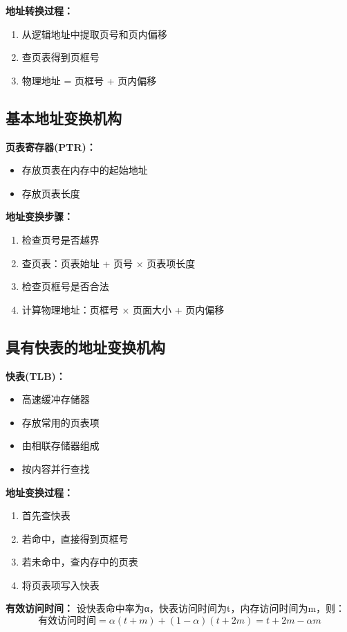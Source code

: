 \documentclass[lang=cn,newtx,10pt,scheme=chinese]{../../elegantbook}
\begin{document}
\textbf{地址转换过程：}
\begin{enumerate}
  \item 从逻辑地址中提取页号和页内偏移
  \item 查页表得到页框号
  \item 物理地址 = 页框号 + 页内偏移
\end{enumerate}

\subsection{基本地址变换机构}

\textbf{页表寄存器(PTR)：}
\begin{itemize}
  \item 存放页表在内存中的起始地址
  \item 存放页表长度
\end{itemize}

\textbf{地址变换步骤：}
\begin{enumerate}
  \item 检查页号是否越界
  \item 查页表：页表始址 + 页号 × 页表项长度
  \item 检查页框号是否合法
  \item 计算物理地址：页框号 × 页面大小 + 页内偏移
\end{enumerate}

\subsection{具有快表的地址变换机构}

\textbf{快表(TLB)：}
\begin{itemize}
  \item 高速缓冲存储器
  \item 存放常用的页表项
  \item 由相联存储器组成
  \item 按内容并行查找
\end{itemize}

\textbf{地址变换过程：}
\begin{enumerate}
  \item 首先查快表
  \item 若命中，直接得到页框号
  \item 若未命中，查内存中的页表
  \item 将页表项写入快表
\end{enumerate}

\textbf{有效访问时间：}
设快表命中率为α，快表访问时间为t，内存访问时间为m，则：
$$\text{有效访问时间} = α(t + m) + (1-α)(t + 2m) = t + 2m - αm$$
\end{document}
